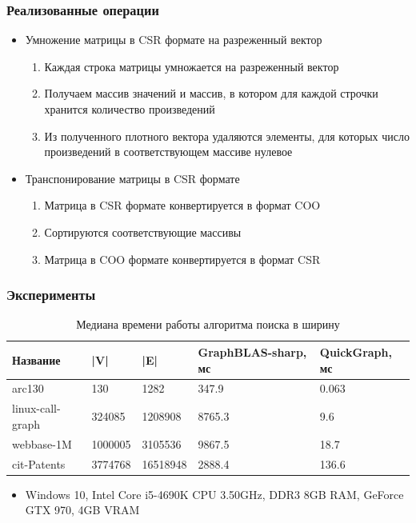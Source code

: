 \documentclass{beamer}
\begin{document}
\begin{frame} 
  \frametitle{Реализованные операции}
  \begin{itemize}
      \item Умножение матрицы в CSR формате на разреженный вектор 
      \begin{enumerate}
        \item Каждая строка матрицы умножается на разреженный вектор
        \item Получаем массив значений и массив, в котором для каждой строчки хранится количество произведений 
        \item Из полученного плотного вектора удаляются элементы, для которых число произведений в соответствующем массиве нулевое
      \end{enumerate}
      \item Транспонирование матрицы в CSR формате
      \begin{enumerate}
        \item Матрица в CSR формате конвертируется в формат COO
        \item Сортируются соответствующие массивы
        \item Матрица в COO формате конвертируется в формат CSR
      \end{enumerate}
  \end{itemize}
\end{frame} 
  
\begin{frame}  
  \frametitle{Эксперименты}
  \begin{table}[htbp]
    \begin{tabularx}{\textwidth}{X|l|l|X|X}
      Название & |V| & |E| & GraphBLAS-sharp, мс & QuickGraph, мс \\
      \hline
      arc130 & 130 & 1282 & 347.9 & 0.063 \\
      linux-call-graph & 324085 & 1208908 & 8765.3 & 9.6 \\
      webbase-1M & 1000005 & 3105536 & 9867.5 & 18.7 \\
      cit-Patents & 3774768 & 16518948 & 2888.4 & 136.6 \\ 
      \hline
    \end{tabularx}
  \caption{Медиана времени работы алгоритма поиска в ширину}
  \end{table}
  \begin{itemize}
    \item Windows 10, Intel Core i5-4690K CPU 3.50GHz, DDR3 8GB RAM, GeForce GTX 970, 4GB VRAM
  \end{itemize}
\end{frame} 
      
\end{document}
